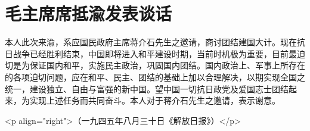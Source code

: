 \section[毛主席席抵渝发表谈话（一九四五年八月三十日）]{毛主席席抵渝发表谈话}


本人此次来渝，系应国民政府主席蒋介石先生之邀请，商讨团结建国大计。现在抗日战争已经胜利结束，中国即将进入和平建设时期，当前时机极为重要，目前最迫切是为保证国内和平，实施民主政治，巩固国内团结。国内政治上、军事上所存在的各项迫切问题，应在和平、民主、团结的基础上加以合理解决，以期实现全国之统一，建设独立、自由与富强的新中国。望中国一切抗日政党及爱国志士团结起来，为实现上述任务而共同奋斗。本人对于蒋介石先生之邀请，表示谢意。

<p align="right">（一九四五年八月三十日《解放日报》）</p>

